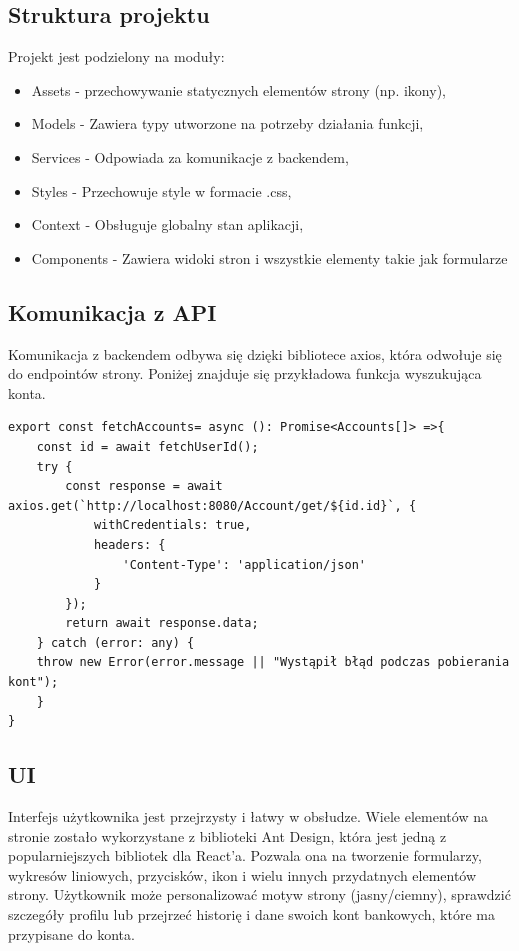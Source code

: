 \subsection*{Struktura projektu}
Projekt jest podzielony na moduły:
\begin{itemize}
	\item Assets - przechowywanie statycznych elementów strony (np. ikony),
	\item Models - Zawiera typy utworzone na potrzeby działania funkcji,
	\item Services - Odpowiada za komunikacje z backendem,
	\item Styles - Przechowuje style w formacie .css,
	\item Context - Obsługuje globalny stan aplikacji,
	\item Components - Zawiera widoki stron i wszystkie elementy takie jak formularze
\end{itemize}
\subsection*{Komunikacja z API}
Komunikacja z backendem odbywa się dzięki bibliotece axios, która odwołuje się do endpointów strony. Poniżej znajduje się przykładowa funkcja wyszukująca konta.
\begin{lstlisting}[caption={Funkcja wyszukująca wszystkie konta użytkownika}, label={lst:TS-service1}]
export const fetchAccounts= async (): Promise<Accounts[]> =>{
	const id = await fetchUserId();
	try {
		const response = await axios.get(`http://localhost:8080/Account/get/${id.id}`, {
			withCredentials: true,
			headers: {
				'Content-Type': 'application/json'
			}
		});
		return await response.data;
	} catch (error: any) {
	throw new Error(error.message || "Wystąpił błąd podczas pobierania kont");
	}
}
\end{lstlisting}

\subsection*{UI}
Interfejs użytkownika jest przejrzysty i łatwy w obsłudze. Wiele elementów na stronie zostało wykorzystane z biblioteki Ant Design, która jest jedną z popularniejszych bibliotek dla React'a. Pozwala ona na tworzenie formularzy, wykresów liniowych, przycisków, ikon i wielu innych przydatnych elementów strony. Użytkownik może personalizować motyw strony (jasny/ciemny), sprawdzić szczegóły profilu lub przejrzeć historię i dane swoich kont bankowych, które ma przypisane do konta.
